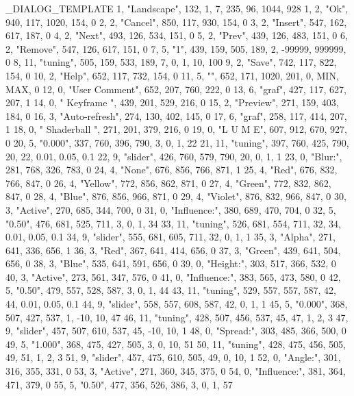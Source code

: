 _DIALOG_TEMPLATE
1,	"Landscape", 132,	1,	7,	235, 96, 1044, 928
   1,	2,	"Ok",		940, 117, 1020, 154, 0
   2,	2,	"Cancel",	850, 117, 930, 154, 0
   3,	2,	"Insert",	547, 162, 617, 187, 0
   4,	2,	"Next",		493, 126, 534, 151, 0
   5,	2,	"Prev",		439, 126, 483, 151, 0
   6,	2,	"Remove",	547, 126, 617, 151, 0
   7,	5,	"1",		439, 159, 505, 189, 2, -99999, 999999, 0
   8,	11,	"tuning",	505, 159, 533, 189, 7, 0, 1, 10, 100
   9,	2,	"Save",		742, 117, 822, 154, 0
   10,	2,	"Help",		652, 117, 732, 154, 0
   11,	5,	"",		652, 171, 1020, 201, 0, MIN, MAX, 0
   12,	0,	"User Comment",	652, 207, 760, 222, 0
   13,	6,	"graf",		427, 117, 627, 207, 1
   14,	0,	" Keyframe ",	439, 201, 529, 216, 0
   15,	2,	"Preview",	271, 159, 403, 184, 0
   16,	3,	"Auto-refresh",	274, 130, 402, 145, 0
   17,	6,	"graf",		258, 117, 414, 207, 1
   18,	0,	" Shaderball ",	271, 201, 379, 216, 0
   19,	0,	"L U M E",	607, 912, 670, 927, 0
   20,	5,	"0.000",	337, 760, 396, 790, 3, 0, 1, 22
   21,	11,	"tuning",	397, 760, 425, 790, 20, 22, 0.01, 0.05, 0.1
   22,	9,	"slider",	426, 760, 579, 790, 20, 0, 1, 1
   23,	0,	"Blur:",	281, 768, 326, 783, 0
   24,	4,	"None",		676, 856, 766, 871, 1
   25,	4,	"Red",		676, 832, 766, 847, 0
   26,	4,	"Yellow",	772, 856, 862, 871, 0
   27,	4,	"Green",	772, 832, 862, 847, 0
   28,	4,	"Blue",		876, 856, 966, 871, 0
   29,	4,	"Violet",	876, 832, 966, 847, 0
   30,	3,	"Active",	270, 685, 344, 700, 0
   31,	0,	"Influence:",	380, 689, 470, 704, 0
   32,	5,	"0.50",		476, 681, 525, 711, 3, 0, 1, 34
   33,	11,	"tuning",	526, 681, 554, 711, 32, 34, 0.01, 0.05, 0.1
   34,	9,	"slider",	555, 681, 605, 711, 32, 0, 1, 1
   35,	3,	"Alpha",	271, 641, 336, 656, 1
   36,	3,	"Red",		367, 641, 414, 656, 0
   37,	3,	"Green",	439, 641, 504, 656, 0
   38,	3,	"Blue",		535, 641, 591, 656, 0
   39,	0,	"Height:",	303, 517, 366, 532, 0
   40,	3,	"Active",	273, 561, 347, 576, 0
   41,	0,	"Influence:",	383, 565, 473, 580, 0
   42,	5,	"0.50",		479, 557, 528, 587, 3, 0, 1, 44
   43,	11,	"tuning",	529, 557, 557, 587, 42, 44, 0.01, 0.05, 0.1
   44,	9,	"slider",	558, 557, 608, 587, 42, 0, 1, 1
   45,	5,	"0.000",	368, 507, 427, 537, 1, -10, 10, 47
   46,	11,	"tuning",	428, 507, 456, 537, 45, 47, 1, 2, 3
   47,	9,	"slider",	457, 507, 610, 537, 45, -10, 10, 1
   48,	0,	"Spread:",	303, 485, 366, 500, 0
   49,	5,	"1.000",	368, 475, 427, 505, 3, 0, 10, 51
   50,	11,	"tuning",	428, 475, 456, 505, 49, 51, 1, 2, 3
   51,	9,	"slider",	457, 475, 610, 505, 49, 0, 10, 1
   52,	0,	"Angle:",	301, 316, 355, 331, 0
   53,	3,	"Active",	271, 360, 345, 375, 0
   54,	0,	"Influence:",	381, 364, 471, 379, 0
   55,	5,	"0.50",		477, 356, 526, 386, 3, 0, 1, 57
